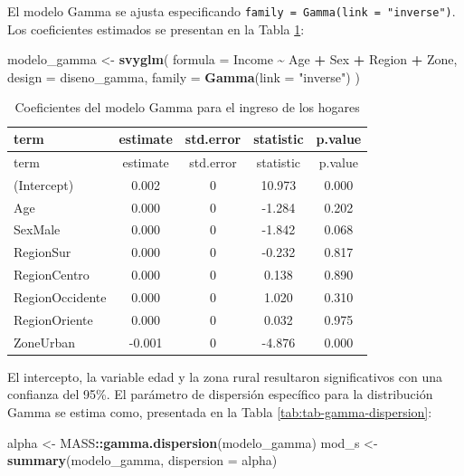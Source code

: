\documentclass[
  spanish,
  12pt,
]{book}
\newenvironment{Shaded}{\begin{snugshade}}{\end{snugshade}}
\newcommand{\AttributeTok}[1]{\textcolor[rgb]{0.13,0.29,0.53}{#1}}
\newcommand{\FunctionTok}[1]{\textcolor[rgb]{0.13,0.29,0.53}{\textbf{#1}}}
\newcommand{\NormalTok}[1]{#1}
\newcommand{\OtherTok}[1]{\textcolor[rgb]{0.56,0.35,0.01}{#1}}
\newcommand{\SpecialCharTok}[1]{\textcolor[rgb]{0.81,0.36,0.00}{\textbf{#1}}}
\newcommand{\StringTok}[1]{\textcolor[rgb]{0.31,0.60,0.02}{#1}}
\begin{document}
El modelo Gamma se ajusta especificando \texttt{family\ =\ Gamma(link\ =\ "inverse")}. Los coeficientes estimados se presentan en la Tabla \ref{tab:tab-gamma-coeficientes}:

\begin{Shaded}
\begin{Highlighting}[]
\NormalTok{modelo\_gamma }\OtherTok{\textless{}{-}} \FunctionTok{svyglm}\NormalTok{(}
  \AttributeTok{formula =}\NormalTok{ Income }\SpecialCharTok{\textasciitilde{}}\NormalTok{ Age }\SpecialCharTok{+}\NormalTok{ Sex }\SpecialCharTok{+}\NormalTok{ Region }\SpecialCharTok{+}\NormalTok{ Zone,}
  \AttributeTok{design  =}\NormalTok{ diseno\_gamma,}
  \AttributeTok{family  =} \FunctionTok{Gamma}\NormalTok{(}\AttributeTok{link =} \StringTok{"inverse"}\NormalTok{)}
\NormalTok{)}
\end{Highlighting}
\end{Shaded}

\begin{longtable}[]{@{}lcccc@{}}
\caption{\label{tab:tab-gamma-coeficientes}Coeficientes del modelo Gamma para el ingreso de los hogares}\tabularnewline
\toprule\noalign{}
term & estimate & std.error & statistic & p.value \\
\midrule\noalign{}
\endfirsthead
\toprule\noalign{}
term & estimate & std.error & statistic & p.value \\
\midrule\noalign{}
\endhead
\bottomrule\noalign{}
\endlastfoot
(Intercept) & 0.002 & 0 & 10.973 & 0.000 \\
Age & 0.000 & 0 & -1.284 & 0.202 \\
SexMale & 0.000 & 0 & -1.842 & 0.068 \\
RegionSur & 0.000 & 0 & -0.232 & 0.817 \\
RegionCentro & 0.000 & 0 & 0.138 & 0.890 \\
RegionOccidente & 0.000 & 0 & 1.020 & 0.310 \\
RegionOriente & 0.000 & 0 & 0.032 & 0.975 \\
ZoneUrban & -0.001 & 0 & -4.876 & 0.000 \\
\end{longtable}

El intercepto, la variable edad y la zona rural resultaron significativos con una confianza del 95\%. El parámetro de dispersión específico para la distribución Gamma se estima como, presentada en la Tabla \ref{tab:tab-gamma-dispersion}:

\begin{Shaded}
\begin{Highlighting}[]
\NormalTok{alpha   }\OtherTok{\textless{}{-}}\NormalTok{ MASS}\SpecialCharTok{::}\FunctionTok{gamma.dispersion}\NormalTok{(modelo\_gamma)}
\NormalTok{mod\_s   }\OtherTok{\textless{}{-}} \FunctionTok{summary}\NormalTok{(modelo\_gamma, }\AttributeTok{dispersion =}\NormalTok{ alpha)}
\end{Highlighting}
\end{Shaded}
\end{document}
